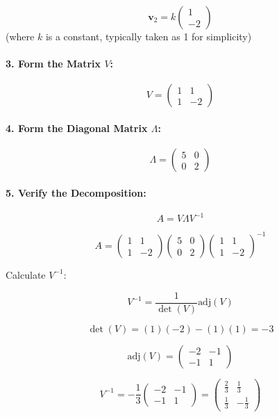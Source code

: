 \documentclass[12pt]{article}
\begin{document}
\[ \mathbf{v}_2 = k \begin{pmatrix} 1 \\ -2 \end{pmatrix} \] (where \( k \) is a constant, typically taken as 1 for simplicity)

\paragraph{3. Form the Matrix \( V \):}

\[ V = \begin{pmatrix} 1 & 1 \\ 1 & -2 \end{pmatrix} \]

\paragraph{4. Form the Diagonal Matrix \( \Lambda \):}

\[ \Lambda = \begin{pmatrix} 5 & 0 \\ 0 & 2 \end{pmatrix} \]

\paragraph{5. Verify the Decomposition:}

\[ A = V \Lambda V^{-1} \]

\[ A = \begin{pmatrix} 1 & 1 \\ 1 & -2 \end{pmatrix} \begin{pmatrix} 5 & 0 \\ 0 & 2 \end{pmatrix} \begin{pmatrix} 1 & 1 \\ 1 & -2 \end{pmatrix}^{-1} \]

Calculate \( V^{-1} \):

\[ V^{-1} = \frac{1}{\det(V)} \text{adj}(V) \]

\[ \det(V) = (1)(-2) - (1)(1) = -3 \]

\[ \text{adj}(V) = \begin{pmatrix} -2 & -1 \\ -1 & 1 \end{pmatrix} \]

\[ V^{-1} = -\frac{1}{3} \begin{pmatrix} -2 & -1 \\ -1 & 1 \end{pmatrix} = \begin{pmatrix} \frac{2}{3} & \frac{1}{3} \\ \frac{1}{3} & -\frac{1}{3} \end{pmatrix} \]
\end{document}
